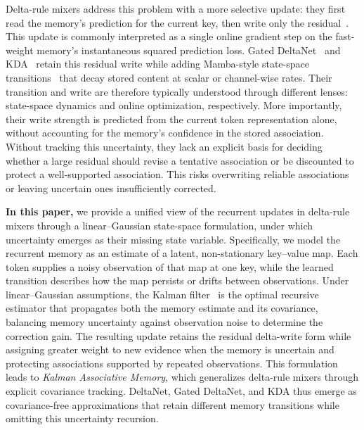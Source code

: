 \documentclass{article} %
\begin{document}
Delta-rule mixers address this problem with a more selective update: they first read the memory's prediction
for the current key, then write only the residual~\citep{schlag2021linear,yang2024parallelizing}.
This update is commonly interpreted as a single online gradient step on the fast-weight memory's
instantaneous squared prediction loss. Gated DeltaNet~\citep{yang2024gdn} and
KDA~\citep{kimiteam2025kimilinear} retain this residual write while adding Mamba-style state-space
transitions~\citep{gu2023mamba,dao2024transformers} that decay stored content at scalar or
channel-wise rates. Their transition and write
are therefore typically understood through different lenses: state-space dynamics and online
optimization, respectively. More importantly, their write strength is predicted from the current
token representation alone, without accounting for the memory's confidence in the stored association.
Without tracking this uncertainty, they lack an explicit basis for deciding whether a large residual
should revise a tentative association or be discounted to protect a well-supported association.
This risks overwriting reliable associations or leaving uncertain ones insufficiently corrected.

\textbf{In this paper,} we provide a unified view of the recurrent updates in delta-rule mixers through a
linear--Gaussian state-space formulation, under which uncertainty emerges as their missing state
variable. Specifically, we model the recurrent memory as an estimate of a latent, non-stationary
key--value map. Each token supplies a noisy observation of that map at one key, while the learned
transition describes how the map persists or drifts between observations. Under linear--Gaussian
assumptions, the Kalman filter~\citep{kalman1960new} is the optimal recursive estimator that
propagates both the memory estimate and its covariance, balancing memory uncertainty against
observation noise to determine the correction gain. The resulting update retains the 
residual delta-write form while assigning greater
weight to new evidence when the memory is uncertain and protecting associations supported by
repeated observations. This formulation leads to \emph{Kalman Associative Memory}, which
generalizes delta-rule mixers through explicit covariance tracking. DeltaNet, Gated DeltaNet, and
KDA thus emerge as covariance-free approximations that retain different memory transitions while omitting this uncertainty recursion.
\end{document}
